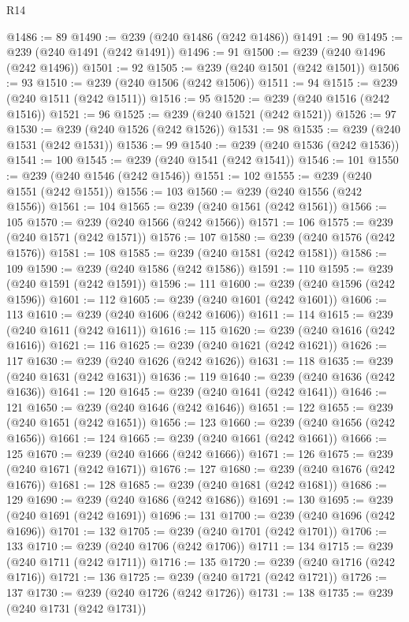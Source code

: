 \begin{lexlean}{R14}
\begin{coremodule}
{{{{{{{{{{{{{{{{{{{{{{{{{{{{{{{{{{{{{{{{{{{{{{{{{{{{{{{{{{{{{{{{{{{{{{{{{{{{{{{{{{{{{{{{{{{{{{{{{{{{{{{{{{@1486 := 89
@1490 := @239 (@240 @1486 (@242 @1486))
@1491 := 90
@1495 := @239 (@240 @1491 (@242 @1491))
@1496 := 91
@1500 := @239 (@240 @1496 (@242 @1496))
@1501 := 92
@1505 := @239 (@240 @1501 (@242 @1501))
@1506 := 93
@1510 := @239 (@240 @1506 (@242 @1506))
@1511 := 94
@1515 := @239 (@240 @1511 (@242 @1511))
@1516 := 95
@1520 := @239 (@240 @1516 (@242 @1516))
@1521 := 96
@1525 := @239 (@240 @1521 (@242 @1521))
@1526 := 97
@1530 := @239 (@240 @1526 (@242 @1526))
@1531 := 98
@1535 := @239 (@240 @1531 (@242 @1531))
@1536 := 99
@1540 := @239 (@240 @1536 (@242 @1536))
@1541 := 100
@1545 := @239 (@240 @1541 (@242 @1541))
@1546 := 101
@1550 := @239 (@240 @1546 (@242 @1546))
@1551 := 102
@1555 := @239 (@240 @1551 (@242 @1551))
@1556 := 103
@1560 := @239 (@240 @1556 (@242 @1556))
@1561 := 104
@1565 := @239 (@240 @1561 (@242 @1561))
@1566 := 105
@1570 := @239 (@240 @1566 (@242 @1566))
@1571 := 106
@1575 := @239 (@240 @1571 (@242 @1571))
@1576 := 107
@1580 := @239 (@240 @1576 (@242 @1576))
@1581 := 108
@1585 := @239 (@240 @1581 (@242 @1581))
@1586 := 109
@1590 := @239 (@240 @1586 (@242 @1586))
@1591 := 110
@1595 := @239 (@240 @1591 (@242 @1591))
@1596 := 111
@1600 := @239 (@240 @1596 (@242 @1596))
@1601 := 112
@1605 := @239 (@240 @1601 (@242 @1601))
@1606 := 113
@1610 := @239 (@240 @1606 (@242 @1606))
@1611 := 114
@1615 := @239 (@240 @1611 (@242 @1611))
@1616 := 115
@1620 := @239 (@240 @1616 (@242 @1616))
@1621 := 116
@1625 := @239 (@240 @1621 (@242 @1621))
@1626 := 117
@1630 := @239 (@240 @1626 (@242 @1626))
@1631 := 118
@1635 := @239 (@240 @1631 (@242 @1631))
@1636 := 119
@1640 := @239 (@240 @1636 (@242 @1636))
@1641 := 120
@1645 := @239 (@240 @1641 (@242 @1641))
@1646 := 121
@1650 := @239 (@240 @1646 (@242 @1646))
@1651 := 122
@1655 := @239 (@240 @1651 (@242 @1651))
@1656 := 123
@1660 := @239 (@240 @1656 (@242 @1656))
@1661 := 124
@1665 := @239 (@240 @1661 (@242 @1661))
@1666 := 125
@1670 := @239 (@240 @1666 (@242 @1666))
@1671 := 126
@1675 := @239 (@240 @1671 (@242 @1671))
@1676 := 127
@1680 := @239 (@240 @1676 (@242 @1676))
@1681 := 128
@1685 := @239 (@240 @1681 (@242 @1681))
@1686 := 129
@1690 := @239 (@240 @1686 (@242 @1686))
@1691 := 130
@1695 := @239 (@240 @1691 (@242 @1691))
@1696 := 131
@1700 := @239 (@240 @1696 (@242 @1696))
@1701 := 132
@1705 := @239 (@240 @1701 (@242 @1701))
@1706 := 133
@1710 := @239 (@240 @1706 (@242 @1706))
@1711 := 134
@1715 := @239 (@240 @1711 (@242 @1711))
@1716 := 135
@1720 := @239 (@240 @1716 (@242 @1716))
@1721 := 136
@1725 := @239 (@240 @1721 (@242 @1721))
@1726 := 137
@1730 := @239 (@240 @1726 (@242 @1726))
@1731 := 138
@1735 := @239 (@240 @1731 (@242 @1731))
}}}}}}}}}}}}}}}}}}}}}}}}}}}}}}}}}}}}}}}}}}}}}}}}}}}}}}}}}}}}}}}}}}}}}}}}}}}}}}}}}}}}}}}}}}}}}}}}}}}}}}}}}}
\end{coremodule}
\end{lexlean}
